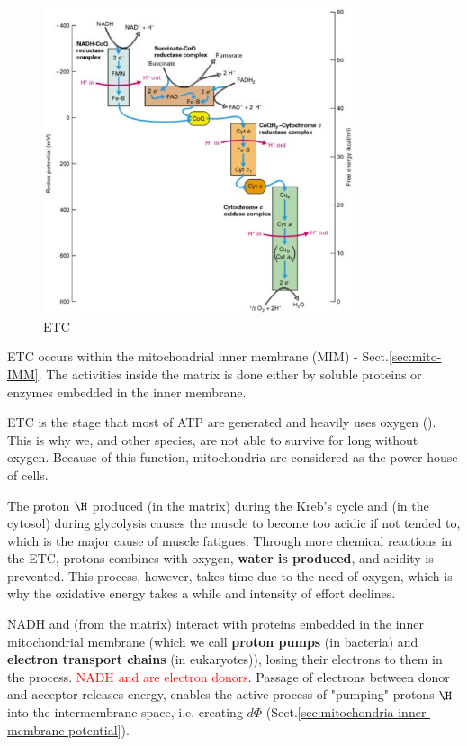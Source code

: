 \begin{figure}[hbt]
  \centerline{\includegraphics[height=9cm,
    angle=0]{./images/ETC.eps}}
\caption{ETC}
\label{fig:ETC}
\end{figure}

ETC occurs within the mitochondrial inner membrane (MIM) -
Sect.\ref{sec:mito-IMM}. The activities inside the matrix is done either by
soluble proteins or enzymes embedded in the inner membrane.

\begin{mdframed}
ETC is the stage that most of ATP are generated and heavily uses oxygen
().  This is why we, and other species, are not able to survive for long
without oxygen. Because of this function, mitochondria are considered as the
power house of cells.

The proton $\H$ produced (in the matrix) during the Kreb's cycle and (in the
cytosol) during glycolysis causes the muscle to become too acidic if not tended
to, which is the major cause of muscle fatigues.  Through more chemical
reactions in the ETC, protons combines with oxygen, {\bf water is produced}, and
acidity is prevented. This process, however, takes time due to the need of
oxygen, which is why the oxidative energy takes a while and intensity of effort
declines.
\end{mdframed}

NADH and  (from the matrix) interact with proteins embedded in the inner
mitochondrial membrane (which we call {\bf proton pumps} (in bacteria) and
{\bf electron transport chains} (in eukaryotes)), losing their electrons to them
in the process. \textcolor{red}{NADH and  are electron donors}.
Passage of electrons between donor and acceptor releases energy,
enables the active process of "pumping" protons $\H$ into the intermembrane
space, i.e. creating $d\Phi$
(Sect.\ref{sec:mitochondria-inner-membrane-potential}).

